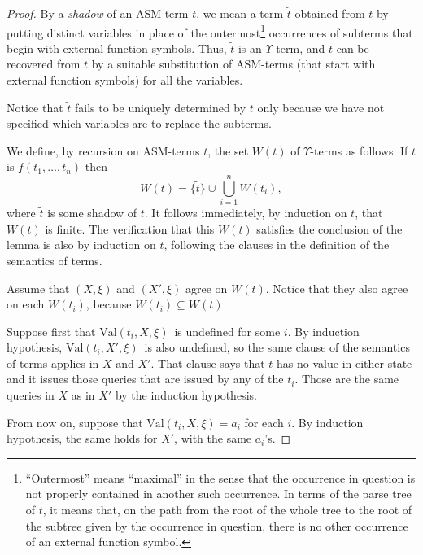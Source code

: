 \documentclass{LMCS}
\theoremstyle{definition}
\newcommand{\U}{\Upsilon}
\newcommand{\val}[3]{\ensuremath{\text{Val}(#1,#2,#3)}}
\begin{document}
\begin{proof}
By a \emph{shadow} of an ASM-term $t$, we mean a term $\tilde t$
obtained from $t$ by putting distinct variables in place of the
outermost\footnote{``Outermost'' means ``maximal'' in the sense that
the occurrence in question is not properly contained in another such
occurrence.  In terms of the parse tree of $t$, it means that, on the
path from the root of the whole tree to the root of the subtree given
by the occurrence in question, there is no other occurrence of an
external function symbol.} occurrences of subterms that begin
with external function symbols.  Thus, $\tilde t$ is an
$\U$-term, and $t$ can be recovered from $\tilde t$ by a
suitable substitution of ASM-terms (that start with external function
symbols) for all the variables.

Notice that $\tilde t$ fails to be uniquely determined
by $t$ only because we have not specified which variables are to replace
the subterms.

We define, by recursion on ASM-terms $t$, the set $W(t)$ of
$\U$-terms as follows.  If $t$ is $f(t_1,\dots,t_n)$ then
$$
W(t)=\{\tilde t\}\cup\bigcup_{i=1}^nW(t_i),
$$
where $\tilde t$ is some shadow of $t$. It follows immediately, by
induction on $t$, that $W(t)$ is finite.  The verification that this
$W(t)$ satisfies the conclusion of the lemma is also by induction on
$t$, following the clauses in the definition of the semantics of
terms.

Assume that $(X,\xi)$ and $(X',\xi)$ agree on $W(t)$.  Notice that
they also agree on each $W(t_i)$, because $W(t_i)\subseteq W(t)$.

Suppose first that \val {t_i}X\xi\ is undefined for some $i$.  By
induction hypothesis, \val{t_i}{X'}\xi\ is also undefined, so the same
clause of the semantics of terms applies in $X$ and $X'$.  That clause
says that $t$ has no value in either state and it issues those queries
that are issued by any of the $t_i$.  Those are the same queries in
$X$ as in $X'$ by the induction hypothesis.

{}From now on, suppose that $\val{t_i}X\xi=a_i$ for each $i$.  By
induction hypothesis, the same holds for $X'$, with the same $a_i$'s.


\end{proof}
\end{document}
